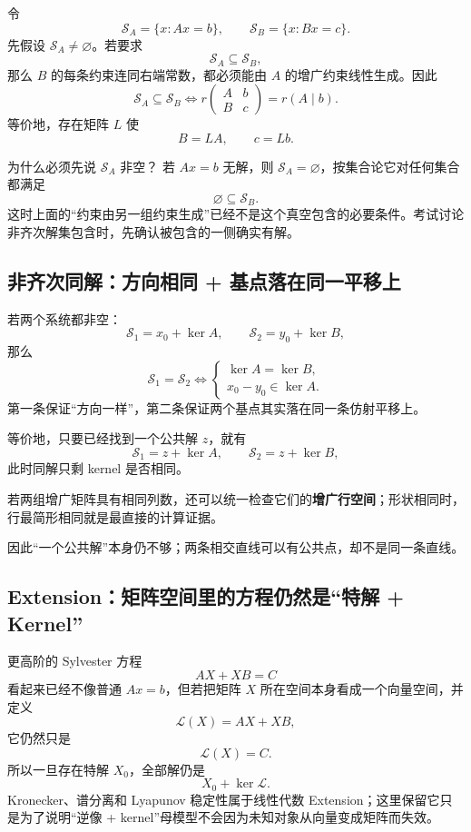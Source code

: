 \documentclass[11pt,a4paper]{ctexart}
\newcommand{\kw}[1]{\textbf{\color{deep}#1}}
\begin{document}
令
\[
\mathcal S_A=\{x:Ax=b\},
\qquad
\mathcal S_B=\{x:Bx=c\}.
\]
先假设 $\mathcal S_A\neq\varnothing$。若要求
\[
\mathcal S_A\subseteq\mathcal S_B,
\]
那么 $B$ 的每条约束连同右端常数，都必须能由 $A$ 的增广约束线性生成。因此
\[
\boxed{
\mathcal S_A\subseteq\mathcal S_B
\iff
r\begin{pmatrix}A&b\\B&c\end{pmatrix}=r(A\mid b).
}
\]
等价地，存在矩阵 $L$ 使
\[
B=LA,
\qquad
c=Lb.
\]

\begin{warnbox}{为什么必须先说 $\mathcal S_A$ 非空？}
若 $Ax=b$ 无解，则 $\mathcal S_A=\varnothing$，按集合论它对任何集合都满足
\[
\varnothing\subseteq\mathcal S_B.
\]
这时上面的“约束由另一组约束生成”已经不是这个真空包含的必要条件。考试讨论非齐次解集包含时，先确认被包含的一侧确实有解。
\end{warnbox}

\subsection{非齐次同解：方向相同 + 基点落在同一平移上}

若两个系统都非空：
\[
\mathcal S_1=x_0+\ker A,
\qquad
\mathcal S_2=y_0+\ker B,
\]
那么
\[
\boxed{
\mathcal S_1=\mathcal S_2
\iff
\begin{cases}
\ker A=\ker B,\\
x_0-y_0\in\ker A.
\end{cases}}
\]
第一条保证“方向一样”，第二条保证两个基点其实落在同一条仿射平移上。

等价地，只要已经找到一个公共解 $z$，就有
\[
\mathcal S_1=z+\ker A,
\qquad
\mathcal S_2=z+\ker B,
\]
此时同解只剩 kernel 是否相同。

若两组增广矩阵具有相同列数，还可以统一检查它们的\kw{增广行空间}；形状相同时，行最简形相同就是最直接的计算证据。

因此“一个公共解”本身仍不够；两条相交直线可以有公共点，却不是同一条直线。

\subsection{Extension：矩阵空间里的方程仍然是“特解 + Kernel”}
更高阶的 Sylvester 方程
\[
AX+XB=C
\]
看起来已经不像普通 $Ax=b$，但若把矩阵 $X$ 所在空间本身看成一个向量空间，并定义
\[
\mathcal L(X)=AX+XB,
\]
它仍然只是
\[
\mathcal L(X)=C.
\]
所以一旦存在特解 $X_0$，全部解仍是
\[
X_0+\ker\mathcal L.
\]
Kronecker、谱分离和 Lyapunov 稳定性属于线性代数 Extension；这里保留它只是为了说明“逆像 + kernel”母模型不会因为未知对象从向量变成矩阵而失效。
\end{document}
